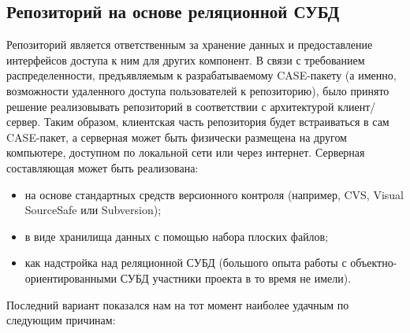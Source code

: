 \documentclass[a5paper]{article}
\begin{document}
\subsection{Репозиторий на основе реляционной СУБД}

Репозиторий является ответственным за хранение данных и предоставление
интерфейсов доступа к ним для других компонент. В связи с требованием
распределенности, предъявляемым к разрабатываемому
CASE-пакету (а именно, возможности удаленного доступа пользователей к репозиторию), было принято решение
реализовывать репозиторий в соответствии с архитектурой клиент/сервер.
Таким образом, клиентская часть репозитория будет встраиваться в сам
CASE-пакет, а серверная может быть физически размещена на другом компьютере, доступном по локальной сети
или через интернет. Серверная составляющая может быть реализована:

\begin{itemize}
  \item на основе стандартных средств версионного контроля (например,
	CVS, Visual SourceSafe или Subversion);
  \item в виде хранилища данных с помощью набора плоских файлов;
  \item как надстройка над реляционной СУБД (большого опыта работы с
	объектно-ориентированными СУБД участники проекта в то время не имели).
\end{itemize}

Последний вариант показался нам на тот момент наиболее удачным по
следующим причинам:
\end{document}
